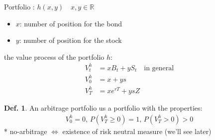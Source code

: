 \documentclass[a4paper,11pt]{jsarticle}
\theoremstyle{definition}
\newtheorem{definition}{Def.}[subsection]
\begin{document}
Portfolio : $h(x,y) \quad x,y\in\mathbb{R}$
\begin{itemize}
  \item $x$: number of position for the bond
  \item $y$: number of position for the stock
\end{itemize}

the value process of the portfolio $h$:
\begin{align}
  V_t^h&=xB_t+yS_t \quad \mbox{in general} \\
  V_0^h&=x+ys \\
  V_T^h&=xe^{rT}+ysZ
\end{align}

\begin{definition}
  An arbitrage portfolio us a portfolio with the properties:
  \begin{align}
    V_0^h=0, \, P(V_T^h\geq 0)=1, \, P(V_T^h>0)>0
  \end{align}
  * no-arbitrage $\Leftrightarrow$ existence of risk neutral measure
  (we'll see later)
\end{definition}
\end{document}

